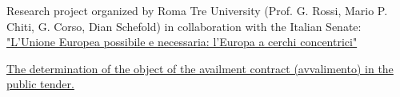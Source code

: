 

\begin{cventries}


  \cventry
    {} %
    {} %
    {} %
    {} %
    {
      \begin{cvitems} %
        \item {Research project organized by Roma Tre University (Prof. G. Rossi, Mario P. Chiti, G. Corso, Dian Schefold) in collaboration with the Italian Senate: \href{http://www.astrid-online.it/static/upload/03-0/03-07-progetto-europa-definitivo.pdf}{"L’Unione Europea
possibile e
necessaria:
l’Europa a cerchi
concentrici"}}
        \item { \href{http://www.contabilita-pubblica.it/Dottrina2016/D'Incecco.pdf}{The determination of the object of the availment contract (avvalimento) in the public tender.}}
      \end{cvitems}
    }


\end{cventries}
